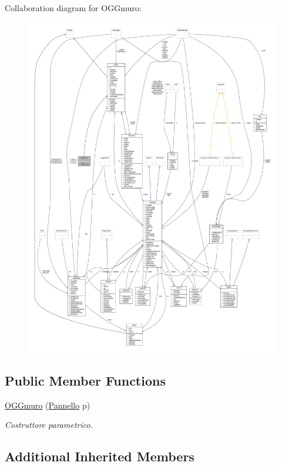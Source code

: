 Collaboration diagram for O\+G\+Gmuro\+:
\nopagebreak
\begin{figure}[H]
\begin{center}
\leavevmode
\includegraphics[width=350pt]{classoggetti_1_1_o_g_gmuro__coll__graph}
\end{center}
\end{figure}
\subsection*{Public Member Functions}
\begin{DoxyCompactItemize}
\item 
\hyperlink{classoggetti_1_1_o_g_gmuro_a938d7b2801316b27b70a11b2728f6811}{O\+G\+Gmuro} (\hyperlink{classa_1_1survival_1_1game_1_1_pannello}{Pannello} p)
\begin{DoxyCompactList}\small\item\em Costruttore parametrico. \end{DoxyCompactList}\end{DoxyCompactItemize}
\subsection*{Additional Inherited Members}


